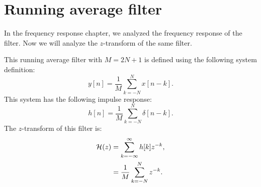 \section{Running average filter}
\label{r_avg_z}

In the frequency response chapter, we analyzed the frequency response
of the  filter. Now we will
analyze the $z$-transform of the same filter.

This running average filter with $M=2N+1$ is defined using the
following system definition:
\begin{equation}
  y[n] = \frac{1}{M}\sum_{k=-N}^{N} x[n-k].
\end{equation}
This system has the following impulse response:
\begin{equation}
  h[n] = \frac{1}{M}\sum_{k=-N}^{N} \delta[n-k].
\end{equation}
The $z$-transform of this filter is:
\begin{align}
  \mathcal{H}(z) & = \sum_{k=-\infty}^{\infty} h[k]z^{-k}, \\
       & = \frac{1}{M}\sum_{k=-N}^{N} z^{-k}.
\end{align}
